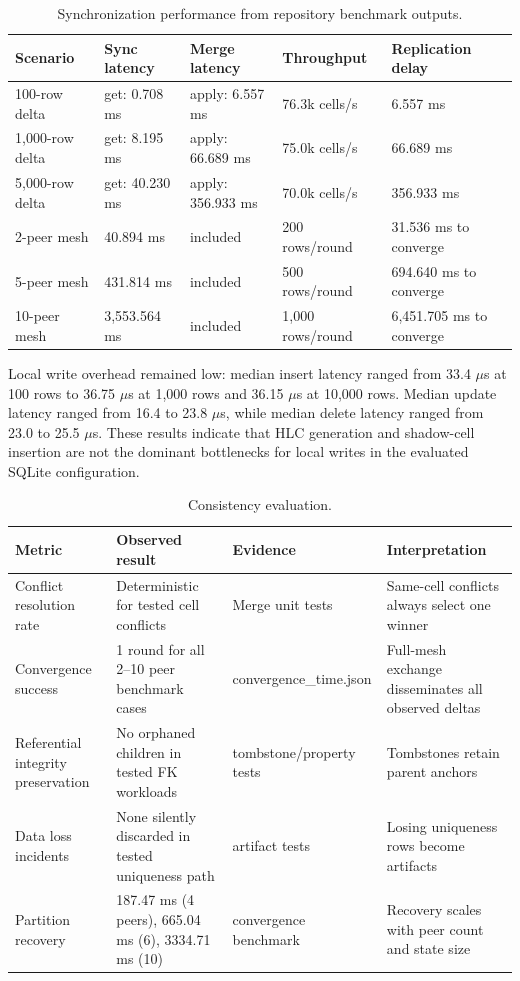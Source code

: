 \documentclass[pdflatex,sn-mathphys-num]{sn-jnl}
\begin{document}
\begin{table}[t]
\centering
\caption{Synchronization performance from repository benchmark outputs.}
\label{tab:sync-performance}
\begin{tabular}{lllll}
\toprule
Scenario & Sync latency & Merge latency & Throughput & Replication delay \\
\midrule
100-row delta & get: 0.708 ms & apply: 6.557 ms & 76.3k cells/s & 6.557 ms \\
1,000-row delta & get: 8.195 ms & apply: 66.689 ms & 75.0k cells/s & 66.689 ms \\
5,000-row delta & get: 40.230 ms & apply: 356.933 ms & 70.0k cells/s & 356.933 ms \\
2-peer mesh & 40.894 ms & included & 200 rows/round & 31.536 ms to converge \\
5-peer mesh & 431.814 ms & included & 500 rows/round & 694.640 ms to converge \\
10-peer mesh & 3,553.564 ms & included & 1,000 rows/round & 6,451.705 ms to converge \\
\bottomrule
\end{tabular}
\end{table}

Local write overhead remained low: median insert latency ranged from 33.4 $\mu$s at 100 rows to 36.75 $\mu$s at 1,000 rows and 36.15 $\mu$s at 10,000 rows. Median update latency ranged from 16.4 to 23.8 $\mu$s, while median delete latency ranged from 23.0 to 25.5 $\mu$s. These results indicate that HLC generation and shadow-cell insertion are not the dominant bottlenecks for local writes in the evaluated SQLite configuration.

\begin{table}[t]
\centering
\caption{Consistency evaluation.}
\label{tab:consistency}
\begin{tabular}{llll}
\toprule
Metric & Observed result & Evidence & Interpretation \\
\midrule
Conflict resolution rate & Deterministic for tested cell conflicts & Merge unit tests & Same-cell conflicts always select one winner \\
Convergence success & 1 round for all 2--10 peer benchmark cases & convergence\_time.json & Full-mesh exchange disseminates all observed deltas \\
Referential integrity preservation & No orphaned children in tested FK workloads & tombstone/property tests & Tombstones retain parent anchors \\
Data loss incidents & None silently discarded in tested uniqueness path & artifact tests & Losing uniqueness rows become artifacts \\
Partition recovery & 187.47 ms (4 peers), 665.04 ms (6), 3334.71 ms (10) & convergence benchmark & Recovery scales with peer count and state size \\
\bottomrule
\end{tabular}
\end{table}
\end{document}
